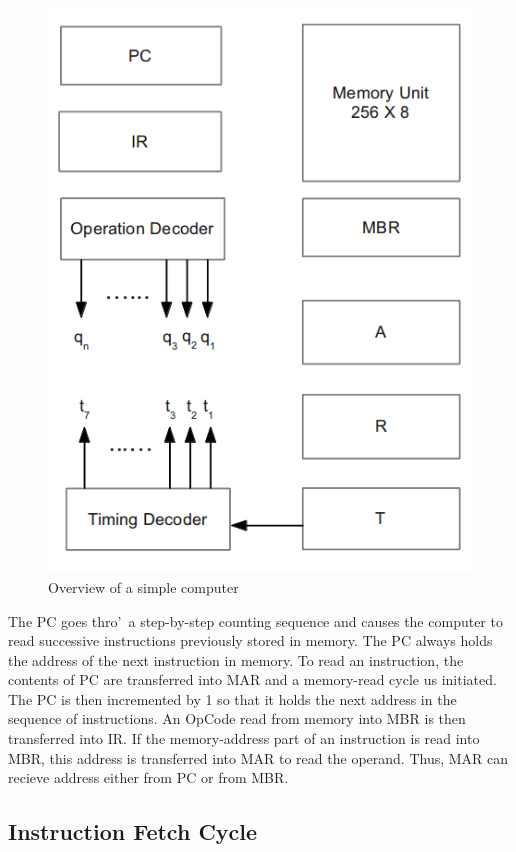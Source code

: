 \documentclass{book}
\begin{document}
\begin{figure}[h]

\begin{center}
  \includegraphics[scale=.60]{imgs/basic_comp.png}
\end{center}
\caption{Overview of a simple computer}
\end{figure}

The PC goes thro\rq\ a step-by-step counting sequence and causes the computer to read successive instructions previously stored in memory. The PC always holds the address of the next instruction in memory. To read an instruction, the contents of PC are transferred into MAR and a memory-read cycle us initiated. The PC is then incremented by 1 so that it holds the next address in the sequence of instructions. An OpCode read from memory into MBR is then transferred into IR. If the memory-address part of an instruction is read into MBR, this address is transferred into MAR to read the operand. Thus, MAR can recieve address either from PC or from MBR.

\subsection{Instruction Fetch Cycle}
\end{document}
